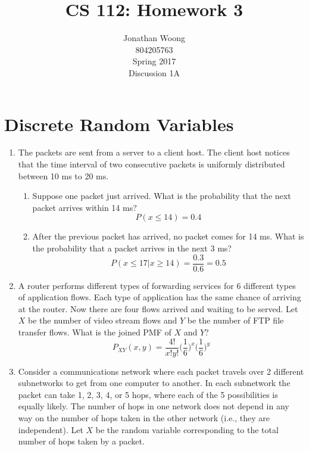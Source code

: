 \documentclass[10.5pt,letterpaper]{article}
\date{\displaydate{date}}
\begin{document}
\title{CS 112: Homework 3}
\author{
	Jonathan Woong\\
	804205763\\
	Spring 2017\\
	Discussion 1A}
\maketitle
\pagebreak


\section{Discrete Random Variables}
\begin{enumerate}[label=\textbf{Problem \arabic*.}]
\item The packets are sent from a server to a client host. The client host notices that the time interval of two consecutive packets is uniformly distributed between 10 ms to 20 ms.
	\begin{enumerate}[label=\alph*)]
	\item Suppose one packet just arrived. What is the probability that the next packet arrives within 14 ms?
	\[P(x\leq 14)=0.4\]
	\item After the previous packet has arrived, no packet comes for 14 ms. What is the probability that a packet arrives in the next 3 ms?
	\[P(x\leq 17 | x \geq 14) = \frac{0.3}{0.6} = 0.5 \]
	\end{enumerate}
\item A router performs different types of forwarding services for 6 different types of application flows. Each type of application has the same chance of arriving at the router. Now there are four flows arrived and waiting to be served. Let $X$ be the number of video stream flows and $Y$ be the number of FTP file transfer flows. What is the joined PMF of $X$ and $Y$?
\[P_{XY}(x,y)=\frac{4!}{x!y!}\bigg(\frac{1}{6}\bigg)^x\bigg(\frac{1}{6}\bigg)^y\]
\item Consider a communications network where each packet travels over 2 different subnetworks to get from one computer to another. In each subnetwork the packet can take 1, 2, 3, 4, or 5 hops, where each of the 5 possibilities is equally likely. The number of hops in one network does not depend in any way on the number of hops taken in the other network (i.e., they are independent). Let $X$ be the random variable corresponding to the total number of hops taken by a packet.
	\begin{enumerate}[label=\alph*)]

\end{enumerate}
\end{enumerate}
\end{document}
